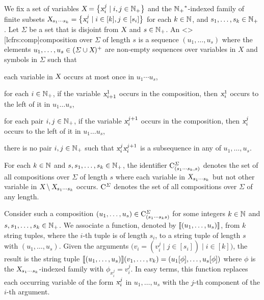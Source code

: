 \documentclass[../../document.tex]{subfiles}
\begin{document}
    \begin{definition}[Compositions]\label{def:lcfrs:comp}
        We fix a set of variables \(\textsl{X} = \big\{ \textsl{x}_i^j \mid i, j \in \mathbb{N}_+ \big\}\) and the \({\mathbb{N}_+}^*\)-indexed family of finite subsets \(\textsl{X}_{s_1\cdots s_k} = \big\{ \textsl{x}_i^j \mid i \in [k], j \in [s_i] \big\}\) for each \(k \in \mathbb{N}\), and \(s_1, \ldots, s_k \in \mathbb{N}_+\).
        Let \(\varSigma\) be a set that is disjoint from \(\textsl{X}\) and \(s \in \mathbb{N}_+\).
        An  <\lcfrs>[lcfrs:comp]{composition} over \(\varSigma\) of length \(s\) is a sequence \((u_1, \ldots, u_s)\) where the elements \(u_1, \dots, u_s \in (\varSigma \cup \textsl{X})^+\) are non-empty sequences over variables in \(X\) and symbols in \(\varSigma\) such that
        \begin{compactenum}
            \item each variable in \(\textsl{X}\) occurs at most once in \(u_1 \cdots u_s\),
            \item for each \(i \in \mathbb{N}_+\), if the variable \(\textsl{x}_{i+1}^1\) occurs in the composition, then \(\textsl{x}_i^1\) occurs to the left of it in \(u_1 \ldots u_s\),
            \item for each pair \(i, j \in \mathbb{N}_+\), if the variable \(\textsl{x}_i^{j+1}\) occurs in the composition, then \(\textsl{x}_i^j\) occurs to the left of it in \(u_1 \ldots u_s\),
            \item there is no pair \(i, j \in \mathbb{N}_+\) such that \(\textsl{x}^j_i\textsl{x}^{j+1}_i\) is a subsequence in any of \(u_1, \ldots, u_s\).
        \end{compactenum}
        For each \(k\in \mathbb{N}\) and \(s, s_1, \ldots, s_k \in \mathbb{N}_+\), the identifier \(\mathrm{C}^\varSigma_{(s_1\cdots s_k, s)}\) denotes the set of all  compositions over \(\varSigma\) of length \(s\) where each variable in \(\textsl{X}_{s_1 \cdots s_k}\) but not other variable in \(\textsl{X} \setminus \textsl{X}_{s_1\cdots s_k}\) occurs.
        \(\mathrm{C}^\varSigma\) denotes the set of all  compositions over \(\varSigma\) of any length.

        Consider such a composition \((u_1, \ldots, u_s) \in \mathrm{C}^\varSigma_{(s_1\cdots s_k s)}\) for some integers \(k \in \mathbb{N}\) and \(s, s_1, \ldots, s_k \in \mathbb{N}_+\).
        We associate a function, denoted by \(\llbracket(u_1, \ldots, u_s)\rrbracket\), from \(k\) string tuples, where the \(i\)-th tuple is of length \(s_i\), to a string tuple of length \(s\) with \((u_1, \ldots, u_s)\).
        Given the arguments \(\big(v_i = (v_i^j \mid j \in [s_i]) \mid i \in [k]\big)\), the result is the string tuple \(
        \llbracket(u_1, \ldots, u_s)\rrbracket(v_1, \ldots, v_k) = (u_1[\phi], \ldots, u_s[\phi])
        \) where \(\phi\) is the \(\textsl{X}_{s_1 \cdots s_k}\)-indexed family with \(\phi_{x_i^j} = v_i^j\).
        In easy terms, this function replaces each occurring variable of the form \(\textsl{x}_i^j\) in \(u_1, \ldots, u_s\) with the \(j\)-th component of the \(i\)-th argument.
    \end{definition}
\end{document}
